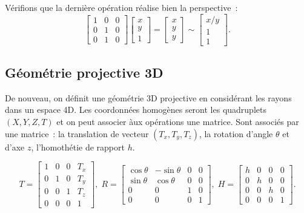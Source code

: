 \documentclass[a4paper,11pt]{amsart}
\begin{document}
V\'erifions que la derni\`ere op\'eration r\'ealise bien la 
perspective~: 
$$\begin{bmatrix}1&0&0\\0&1&0\\0&1&0\end{bmatrix}\begin{bmatrix}x
\\y\\1\end{bmatrix}= 
\begin{bmatrix}x\\y\\y\end{bmatrix}\sim 
\begin{bmatrix}x/y\\1\\1\end{bmatrix}.$$
\subsection{G\'eom\'etrie projective 3D}
De nouveau, on d\'efinit une g\'eom\'etrie 3D projective en 
consid\'erant les rayons dans un espace 4D. Les coordonn\'ees 
homog\`enes seront les quadruplets $(X,Y,Z,T)$ et on peut associer 
\`aux op\'erations une matrice.  Sont associ\'es par une matrice~: la 
translation de vecteur $(T_x,T_y,T_z)$, la rotation d'angle $\theta$ 
et d'axe $z$, l'homoth\'etie de rapport $h$.

$$T=\begin{bmatrix}1&0&0&T_x\\0&1&0&T_y\\0&0&1&T_z\\0&0&0&1\end{bmatrix},
\; 
R=\begin{bmatrix}\cos\theta&-\sin\theta&0&0\\
\sin\theta&\cos\theta&0&0\\0&0&1&0\\0&0&0&1\end{bmatrix},\; 
H=\begin{bmatrix}h&0&0&0\\0&h&0&0\\0&0&h&0\\0&0&0&1\end{bmatrix}.$$
\end{document}
